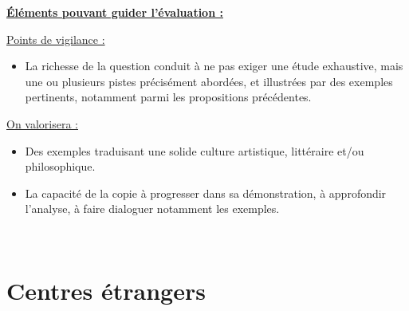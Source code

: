 {\textbf{\underline{Éléments pouvant guider l’évaluation :}}

\underline{Points de vigilance :}

\begin{itemize}
\item La richesse de la question conduit à ne pas exiger une étude exhaustive, mais une
ou plusieurs pistes précisément abordées, et illustrées par des exemples pertinents,
notamment parmi les propositions précédentes.
\end{itemize}

\underline{On valorisera :}

\begin{itemize}
\item Des exemples traduisant une solide culture artistique, littéraire et/ou philosophique.

\item La capacité de la copie à progresser dans sa démonstration, à approfondir l’analyse,
à faire dialoguer notamment les exemples.

\end{itemize}}%
\vfill{~}\clearpage

\section{Centres étrangers}

